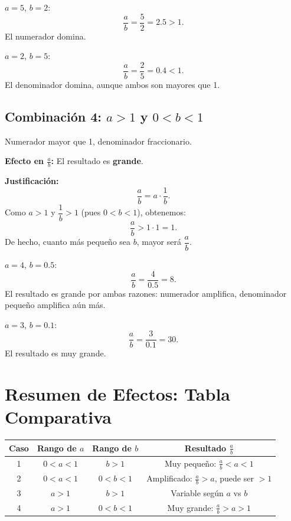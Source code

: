 \begin{ejemplo}
$a = 5$, $b = 2$:
\[
\frac{a}{b} = \frac{5}{2} = 2.5 > 1.
\]
El numerador domina.
\end{ejemplo}

\begin{ejemplo}
$a = 2$, $b = 5$:
\[
\frac{a}{b} = \frac{2}{5} = 0.4 < 1.
\]
El denominador domina, aunque ambos son mayores que 1.
\end{ejemplo}

\subsection{Combinación 4: $a > 1$ y $0 < b < 1$}

\begin{caso}
Numerador mayor que 1, denominador fraccionario.
\end{caso}

\textbf{Efecto en $\frac{a}{b}$:} El resultado es \textbf{grande}.

\textbf{Justificación:}
\[
\frac{a}{b} = a \cdot \frac{1}{b}.
\]
Como $a > 1$ y $\dfrac{1}{b} > 1$ (pues $0 < b < 1$), obtenemos:
\[
\frac{a}{b} > 1 \cdot 1 = 1.
\]
De hecho, cuanto más pequeño sea $b$, mayor será $\dfrac{a}{b}$.

\begin{ejemplo}
$a = 4$, $b = 0.5$:
\[
\frac{a}{b} = \frac{4}{0.5} = 8.
\]
El resultado es grande por ambas razones: numerador amplifica, denominador pequeño amplifica aún más.
\end{ejemplo}

\begin{ejemplo}
$a = 3$, $b = 0.1$:
\[
\frac{a}{b} = \frac{3}{0.1} = 30.
\]
El resultado es muy grande.
\end{ejemplo}

\section{Resumen de Efectos: Tabla Comparativa}

\begin{center}
\begin{tabular}{|c|c|c|c|}
\hline
\textbf{Caso} & \textbf{Rango de $a$} & \textbf{Rango de $b$} & \textbf{Resultado $\frac{a}{b}$} \\
\hline
1 & $0 < a < 1$ & $b > 1$ & Muy pequeño: $\frac{a}{b} < a < 1$ \\
\hline
2 & $0 < a < 1$ & $0 < b < 1$ & Amplificado: $\frac{a}{b} > a$, puede ser $> 1$ \\
\hline
3 & $a > 1$ & $b > 1$ & Variable según $a$ vs $b$ \\
\hline
4 & $a > 1$ & $0 < b < 1$ & Muy grande: $\frac{a}{b} > a > 1$ \\
\hline
\end{tabular}
\end{center}

